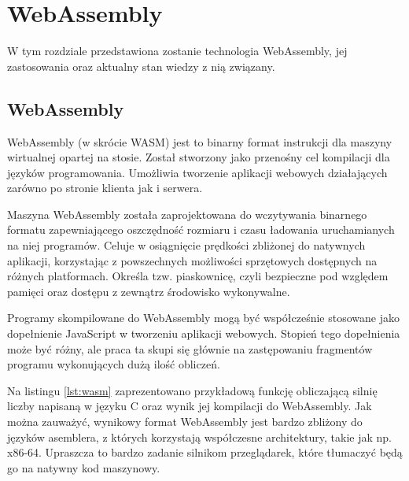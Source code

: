\documentclass[language=polish,type=master]{aghmodern}
\begin{document}
\chapter{WebAssembly}
W tym rozdziale przedstawiona zostanie technologia WebAssembly, jej zastosowania oraz aktualny stan wiedzy z nią związany.

\section{WebAssembly}
WebAssembly (w skrócie WASM) jest to binarny format instrukcji dla maszyny wirtualnej opartej na stosie.
Został stworzony jako przenośny cel kompilacji dla języków programowania\footnotemark{}.
Umożliwia tworzenie aplikacji webowych działających zarówno po stronie klienta jak i serwera.

Maszyna WebAssembly została zaprojektowana do wczytywania binarnego formatu zapewniającego oszczędność rozmiaru i czasu ładowania uruchamianych na niej programów.
Celuje w osiągnięcie prędkości zbliżonej do natywnych aplikacji, korzystając z powszechnych możliwości sprzętowych\footnotemark{} dostępnych na różnych platformach.
Określa tzw. piaskownicę\footnotemark{}, czyli bezpieczne pod względem pamięci oraz dostępu z zewnątrz środowisko wykonywalne.

Programy skompilowane do WebAssembly mogą być współcześnie stosowane jako dopełnienie JavaScript w tworzeniu aplikacji webowych.
Stopień tego dopełnienia może być różny, ale praca ta skupi się głównie na zastępowaniu fragmentów programu wykonujących dużą ilość obliczeń.

Na listingu \ref{lst:wasm} zaprezentowano przykładową funkcję obliczającą silnię liczby napisaną w języku C oraz wynik jej kompilacji do WebAssembly.
Jak można zauważyć, wynikowy format WebAssembly jest bardzo zbliżony do języków asemblera, z których korzystają współczesne architektury, takie jak np. x86-64.
Upraszcza to bardzo zadanie silnikom przeglądarek, które tłumaczyć będą go na natywny kod maszynowy.
\end{document}
